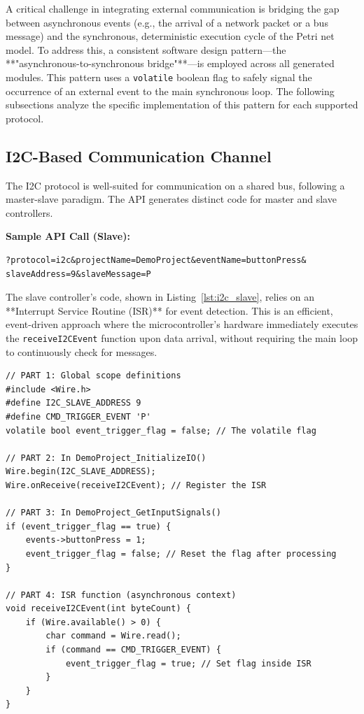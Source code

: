 A critical challenge in integrating external communication is bridging the gap between asynchronous events (e.g., the arrival of a network packet or a bus message) and the synchronous, deterministic execution cycle of the Petri net model. To address this, a consistent software design pattern—the **"asynchronous-to-synchronous bridge"**—is employed across all generated modules. This pattern uses a \texttt{volatile} boolean flag to safely signal the occurrence of an external event to the main synchronous loop. The following subsections analyze the specific implementation of this pattern for each supported protocol.

\subsection{I2C-Based Communication Channel}
The I2C protocol is well-suited for communication on a shared bus, following a master-slave paradigm. The API generates distinct code for master and slave controllers.

\noindent\textbf{Sample API Call (Slave):}
\begin{verbatim}
?protocol=i2c&projectName=DemoProject&eventName=buttonPress&
slaveAddress=9&slaveMessage=P
\end{verbatim}

The slave controller's code, shown in Listing~\ref{lst:i2c_slave}, relies on an **Interrupt Service Routine (ISR)** for event detection. This is an efficient, event-driven approach where the microcontroller's hardware immediately executes the \texttt{receiveI2CEvent} function upon data arrival, without requiring the main loop to continuously check for messages.

\begin{verbatim}
// PART 1: Global scope definitions
#include <Wire.h>
#define I2C_SLAVE_ADDRESS 9
#define CMD_TRIGGER_EVENT 'P'
volatile bool event_trigger_flag = false; // The volatile flag

// PART 2: In DemoProject_InitializeIO()
Wire.begin(I2C_SLAVE_ADDRESS);
Wire.onReceive(receiveI2CEvent); // Register the ISR

// PART 3: In DemoProject_GetInputSignals()
if (event_trigger_flag == true) {
    events->buttonPress = 1;
    event_trigger_flag = false; // Reset the flag after processing
}

// PART 4: ISR function (asynchronous context)
void receiveI2CEvent(int byteCount) {
    if (Wire.available() > 0) {
        char command = Wire.read();
        if (command == CMD_TRIGGER_EVENT) {
            event_trigger_flag = true; // Set flag inside ISR
        }
    }
}
\end{verbatim}

